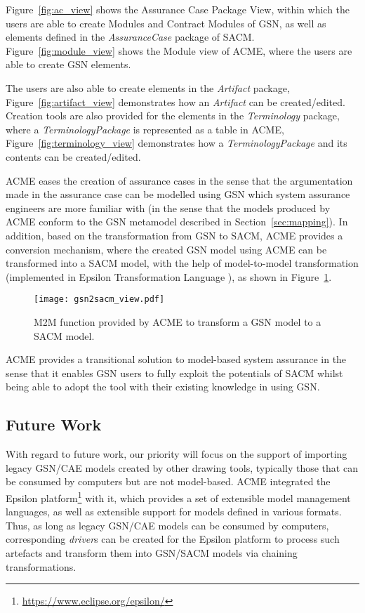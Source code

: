 Figure~\ref{fig:ac_view} shows the Assurance Case Package View, within which the users are able to create Modules and Contract Modules of GSN, as well as elements defined in the \textit{AssuranceCase} package of SACM. 
Figure~\ref{fig:module_view} shows the Module view of ACME, where the users are able to create GSN elements. 

The users are also able to create elements in the \textit{Artifact} package, Figure~\ref{fig:artifact_view} demonstrates how an \textit{Artifact} can be created/edited. 
Creation tools are also provided for the elements in the \textit{Terminology} package, where a \textit{TerminologyPackage} is represented as a table in ACME, Figure~\ref{fig:terminology_view} demonstrates how a \textit{TerminologyPackage} and its contents can be created/edited.

ACME eases the creation of assurance cases in the sense that the argumentation made in the assurance case can be modelled using GSN which system assurance engineers are more familiar with (in the sense that the models produced by ACME conform to the GSN metamodel described in Section~\ref{sec:mapping}). 
In addition, based on the transformation from GSN to SACM, ACME provides a conversion mechanism, where the created GSN model using ACME can be transformed into a SACM model, with the help of model-to-model transformation (implemented in Epsilon Transformation Language \cite{kolovos2008epsilon}), as shown in Figure~\ref{fig:transformation_view}.

\begin{figure}
	\centering
	\texttt{[image: gsn2sacm\_view.pdf]}
	\caption{M2M function provided by ACME to transform a GSN model to a SACM model.}
	\label{fig:transformation_view}
\end{figure}

ACME provides a transitional solution to model-based system assurance in the sense that it enables GSN users to fully exploit the potentials of SACM whilst being able to adopt the tool with their existing knowledge in using GSN. 

\subsection{Future Work}
With regard to future work, our priority will focus on the support of importing legacy GSN/CAE models created by other drawing tools, typically those that can be consumed by computers but are not model-based. 
ACME integrated the Epsilon platform\footnote{\url{https://www.eclipse.org/epsilon/}} with it, which provides a set of extensible model management languages, as well as extensible support for models defined in various formats.
Thus, as long as legacy GSN/CAE models can be consumed by computers, corresponding \textit{driver}s can be created for the Epsilon platform to process such artefacts and transform them into GSN/SACM models via chaining transformations.

